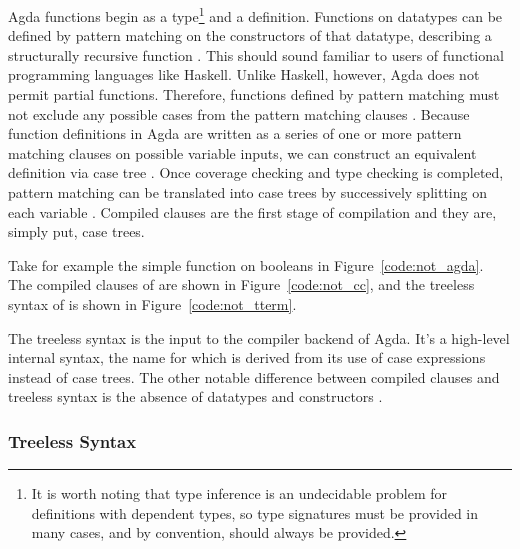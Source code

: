 Agda functions begin as a type\footnote{It is worth noting that type inference is an undecidable problem for definitions with dependent types, so type signatures must be provided in many cases, and by convention, should always be provided.} and a definition. Functions on datatypes can be defined by pattern matching on the constructors of that datatype, describing a structurally recursive function \citep{agdawiki}. %
This should sound familiar to users of functional programming languages like Haskell. Unlike Haskell, however, Agda does not permit partial functions. Therefore, functions defined by pattern matching must not exclude any possible cases from the pattern matching clauses \citep{agdawiki}. %
Because function definitions in Agda are written as a series of one or more pattern matching clauses on possible variable inputs, we can construct an equivalent definition via case tree \citep{agdawiki}. %
Once coverage checking and type checking is completed, pattern matching can be translated into case trees by successively splitting on each variable \citep{agdahackage}. %
Compiled clauses are the first stage of compilation and they are, simply put, case trees.

Take for example the simple  function on booleans in Figure~\ref{code:not_agda}. The compiled clauses of  are shown in Figure~\ref{code:not_cc}, and the treeless syntax of  is shown in Figure~\ref{code:not_tterm}.



The treeless syntax is the input to the compiler backend of Agda. It's a high-level internal syntax, the name for which is derived from its use of case expressions instead of case trees. The other notable difference between compiled clauses and treeless syntax is the absence of datatypes and constructors \citep{agdahackage}. %

\subsubsection{Treeless Syntax}

